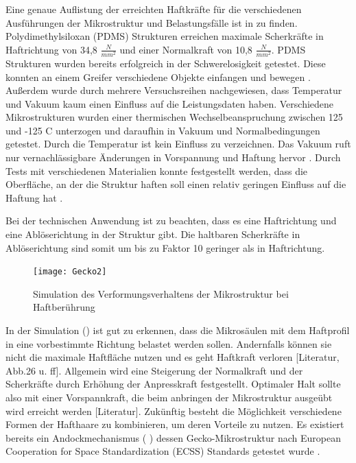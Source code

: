 Eine genaue Auflistung der erreichten Haftkräfte für die verschiedenen Ausführungen der Mikrostruktur und Belastungsfälle ist in \cite[Tabelle1, Seite 23]{Schwerter.} zu finden.
Polydimethylsiloxan (PDMS) Strukturen erreichen maximale Scherkräfte in Haftrichtung von 34,8 $\frac{N}{mm^{2}}$ und einer Normalkraft von 10,8 $\frac{N}{mm^{2}}$.
PDMS Strukturen wurden bereits erfolgreich in der Schwerelosigkeit getestet. Diese konnten an einem Greifer verschiedene Objekte einfangen und bewegen \cite{Schwerter.}. Außerdem wurde durch mehrere Versuchsreihen nachgewiesen, dass Temperatur und Vakuum kaum einen Einfluss auf die Leistungsdaten haben. Verschiedene Mikrostrukturen wurden einer thermischen Wechselbeanspruchung zwischen 125 und  -125 \textdegree{} C unterzogen und daraufhin in Vakuum und Normalbedingungen getestet. Durch die Temperatur ist kein Einfluss zu verzeichnen. Das Vakuum ruft nur vernachlässigbare Änderungen in Vorspannung und Haftung hervor \cite[Seite 7, Figure 11]{Moreels.}. Durch Tests mit verschiedenen Materialien konnte festgestellt werden, dass die Oberfläche, an der die Struktur haften soll einen relativ geringen Einfluss auf die Haftung hat \cite[Seite 9, Figure 16]{Moreels.}. 

Bei der technischen Anwendung ist zu beachten, dass es eine Haftrichtung und eine Ablöserichtung in der Struktur gibt. Die haltbaren Scherkräfte in Ablöserichtung sind somit um bis zu Faktor 10 geringer als in Haftrichtung\cite{Schwerter.}.
\begin{figure}[h]
	\centering
		\texttt{[image: Gecko2]}
	\caption{Simulation des Verformungsverhaltens der Mikrostruktur bei Haftberührung \cite[Abbildung 19, Seite43]{Schwerter.}}
	\label{fig:Gecko2}
\end{figure}	


In der Simulation () ist gut zu erkennen, dass die Mikrosäulen mit dem Haftprofil in eine vorbestimmte Richtung belastet werden sollen. Andernfalls können sie nicht die maximale Haftfläche nutzen und es geht Haftkraft verloren [Literatur, Abb.26 u. ff]. 
Allgemein wird eine Steigerung der Normalkraft und der Scherkräfte durch Erhöhung der Anpresskraft festgestellt. Optimaler Halt sollte also mit einer Vorspannkraft, die beim anbringen der Mikrostruktur ausgeübt wird erreicht werden [Literatur].  Zukünftig besteht die Möglichkeit verschiedene Formen der Hafthaare zu kombinieren, um deren Vorteile zu nutzen. 
Es existiert bereits ein Andockmechanismus ( ) dessen Gecko-Mikrostruktur nach  European Cooperation for Space Standardization (ECSS) Standards getestet wurde \cite[Seite 10]{Moreels.}. 


